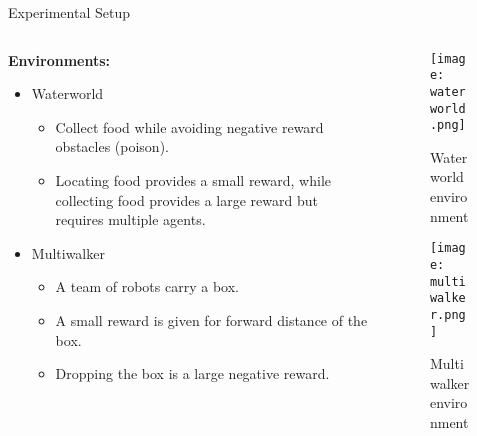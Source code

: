 \begin{frame}{Experimental Setup}
\begin{columns}
    \begin{column}{0.5\textwidth}
        \textbf{Environments:}
        \begin{itemize}
            \item Waterworld
            \begin{itemize}
                \item Collect food while avoiding negative reward obstacles (poison).
                \item Locating food provides a small reward, 
                    while collecting food provides a large reward but requires multiple agents.
            \end{itemize}
            \item Multiwalker
            \begin{itemize}
                \item A team of robots carry a box.
                \item A small reward is given for forward distance of the box.
                \item Dropping the box is a large negative reward.
            \end{itemize}
        \end{itemize}
        \vfil
    \end{column}
    \begin{column}{0.5\textwidth}
        \begin{figure}
            \texttt{[image: waterworld.png]}
            \caption{Waterworld environment}
        \end{figure}
        \vspace{-1em}
        \begin{figure}
            \texttt{[image: multiwalker.png]}
            \caption{Multiwalker environment}
        \end{figure}
    \end{column}
\end{columns}
\end{frame}

